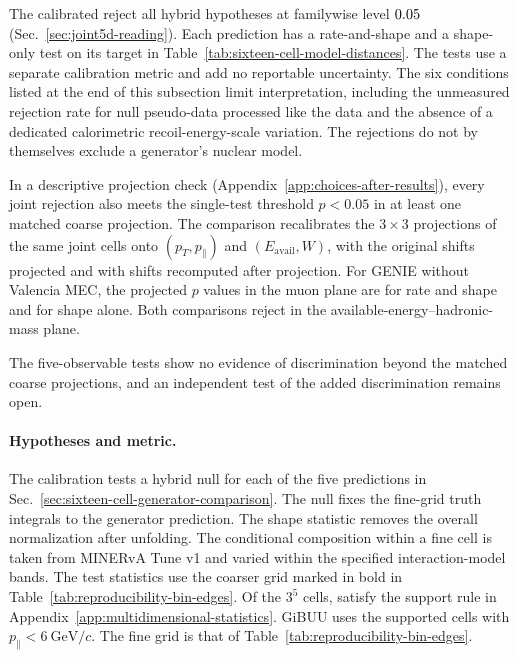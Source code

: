 The calibrated \resJoint{} reject all \jtNtests{} hybrid hypotheses at familywise level $0.05$ (Sec.~\ref{sec:joint5d-reading}). Each prediction has a rate-and-shape and a shape-only test on its target in Table~\ref{tab:sixteen-cell-model-distances}. The tests use a separate calibration metric and add no reportable uncertainty. The six conditions listed at the end of this subsection limit interpretation, including the unmeasured rejection rate for null pseudo-data processed like the data and the absence of a dedicated calorimetric recoil-energy-scale variation. The rejections do not by themselves exclude a generator's nuclear model.

In a descriptive projection check (Appendix~\ref{app:choices-after-results}), every joint rejection also meets the single-test threshold $p<0.05$ in at least one matched coarse projection. The comparison recalibrates the $3\times3$ projections of the same joint cells onto $(p_T,p_\parallel)$ and $(E_{\mathrm{avail}},W)$, with the original shifts projected and with shifts recomputed after projection. For GENIE without Valencia MEC, the projected $p$ values in the muon plane are \woneGcvPtTot{} for rate and shape and \woneGcvPtShape{} for shape alone. Both comparisons reject in the available-energy--hadronic-mass plane.

The five-observable tests show no evidence of discrimination beyond the matched coarse projections, and an independent test of the added discrimination remains open.

\label{sec:joint5d-design}
\label{sec:joint5d-calibration}
\label{app:joint5d-genmodel}
\label{sec:joint5d-frozen}
\label{sec:joint5d-fwer}


\label{sec:joint5d-kappa}
\label{sec:joint5d-lost}
\label{sec:joint5d-projections}
\label{sec:joint5d-ch}

\paragraph{Hypotheses and metric.} The calibration tests a hybrid null for each of the five predictions in Sec.~\ref{sec:sixteen-cell-generator-comparison}. The null fixes the fine-grid truth integrals to the generator prediction. The shape statistic removes the overall normalization after unfolding. The conditional composition within a fine cell is taken from MINERvA Tune v1 and varied within the specified interaction-model bands. The test statistics use the coarser grid marked in bold in Table~\ref{tab:reproducibility-bin-edges}. Of the $3^5$ cells, \jtNcells{} satisfy the support rule in Appendix~\ref{app:multidimensional-statistics}. GiBUU uses the \jtNcellsGiBUU{} supported cells with $p_\parallel<6~\mathrm{GeV}/c$. The fine grid is that of Table~\ref{tab:reproducibility-bin-edges}.

